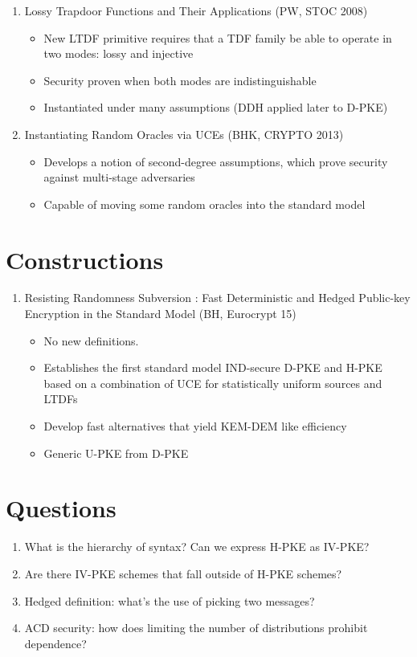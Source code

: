 \documentclass[11pt, pdftex]{article}
\begin{document}
\begin{enumerate}
\item Lossy Trapdoor Functions and Their Applications (PW, STOC 2008)
\begin{itemize}
\item New LTDF primitive requires that a TDF family be able to operate in two modes: lossy and injective
\item Security proven when both modes are indistinguishable
\item Instantiated under many assumptions (DDH applied later to D-PKE)
\end{itemize}

\item Instantiating Random Oracles via UCEs (BHK, CRYPTO 2013)
\begin{itemize}
\item Develops a notion of second-degree assumptions, which prove security against multi-stage adversaries
\item Capable of moving some random oracles into the standard model
\end{itemize}
\end{enumerate}

\section{Constructions}

\begin{enumerate}
\item Resisting Randomness Subversion : Fast Deterministic and Hedged Public-key Encryption in the Standard Model (BH, Eurocrypt 15)
\begin{itemize}
\item No new definitions.
\item Establishes the first standard model IND-secure D-PKE and H-PKE based on a combination of UCE for statistically uniform sources and LTDFs
\item Develop fast alternatives that yield KEM-DEM like efficiency
\item Generic U-PKE from D-PKE
\end{itemize}
\end{enumerate}


\section{Questions}
\begin{enumerate}
\item What is the hierarchy of syntax?  Can we express H-PKE as IV-PKE? 
\item Are there IV-PKE schemes that fall outside of H-PKE schemes?
\item Hedged definition: what's the use of picking two messages?
\item ACD security: how does limiting the number of distributions prohibit dependence?
\end{enumerate}
\end{document}
